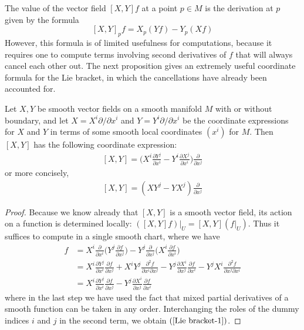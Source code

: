 The value of the vector field $[X,Y]f$ at a point $p\in M$ is the derivation at $p$ given by the formula
\[[X,Y]_pf=X_p(Yf)-Y_p(Xf)\]
However, this formula is of limited usefulness for computations, because it requires one to compute terms involving second derivatives of $f$ that will always cancel each other out. The next proposition gives an extremely useful coordinate formula for the Lie bracket, in which the cancellations have already been accounted for.
\begin{proposition}\label{Lie Bracket coordinate formula}
Let $X,Y$ be smooth vector fields on a smooth manifold $M$ with or without boundary, and let $X=X^i\partial/\partial x^i$ and $Y=Y^i\partial/\partial x^i$ be the coordinate expressions for $X$ and $Y$ in terms of some smooth local coordinates $(x^i)$ for $M$. Then $[X,Y]$ has the following coordinate
expression:
\begin{align}\label{Lie bracket-1}
[X,Y]=\Big(X^i\frac{\partial Y^j}{\partial x^i}-Y^i\frac{\partial X^j}{\partial x^i}\Big)\frac{\partial}{\partial x^j}
\end{align}
or more concisely,
\begin{align}\label{Lie bracket-2}
[X,Y]=(XY^j-YX^j)\frac{\partial}{\partial x^j}
\end{align}
\end{proposition}
\begin{proof}
Because we know already that $[X,Y]$ is a smooth vector field, its action on a function is determined locally: $([X,Y]f)|_U=[X,Y](f|_U)$. Thus it suffices to compute in a single smooth chart, where we have
\begin{align*}
[X,Y]f&=X^i\frac{\partial}{\partial x^i}\Big(Y^j\frac{\partial f}{\partial x^j}\Big)-Y^j\frac{\partial}{\partial x^j}\Big(X^i\frac{\partial f}{\partial x^i}\Big)\\
&=X^i\frac{\partial Y^j}{\partial x^i}\frac{\partial f}{\partial x^j}+X^iY^j\frac{\partial^2f}{\partial x^i\partial x^j}-Y^j\frac{\partial X^i}{\partial x^j}\frac{\partial f}{\partial x^i}-Y^jX^i\frac{\partial^2f}{\partial x^j\partial x^i}\\
&=X^i\frac{\partial Y^j}{\partial x^i}\frac{\partial f}{\partial x^j}-Y^j\frac{\partial X^i}{\partial x^j}\frac{\partial f}{\partial x^i}
\end{align*}
where in the last step we have used the fact that mixed partial derivatives of a smooth function can be taken in any order. Interchanging the roles of the dummy indices $i$ and $j$ in the second term, we obtain $(\ref{Lie bracket-1})$.
\end{proof}
